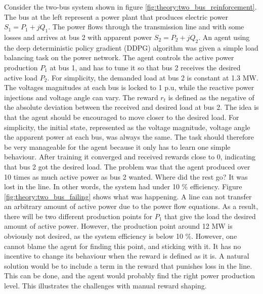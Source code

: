 \documentclass[class=book, crop=false, 11pt]{standalone}
\begin{document}
Consider the two-bus system shown in figure \ref{fig:theory:two_bus_reinforcement}. The bus at the left represent a power plant that produces electric power $S_{1} = P_{1} + jQ_{1}$. The power flows through the transmission line and with some losses and arrives at bus 2 with apparent power $S_{2} = P_{2} + jQ_{2}$. An agent using the deep deterministic policy gradient (DDPG) algorithm was given a simple load balancing task on the power network. The agent controls the active power production $P_{1}$ at bus 1, and has to tune it so that bus 2 receives the desired active load $P_{2}$. For simplicity, the demanded load at bus 2 is constant at 1.3 MW. The voltages magnitudes at each bus is locked to 1 p.u, while the reactive power injections and voltage angle can vary. The reward $r_{t}$ is defined as the negative of the absolute deviation between the received and desired load at bus 2. The idea is that the agent should be encouraged to move closer to the desired load. For simplicity, the initial state, represented as the voltage magnitude, voltage angle the apparent power at each bus, was always the same. The task should therefore be very manageable for the agent because it only has to learn one simple behaviour. After training it converged and received rewards close to 0, indicating that bus 2 got the desired load. The problem was that the agent produced over 10 times as much active power as bus 2 wanted. Where did the rest go? It was lost in the line. In other words, the system had under 10 \% efficiency. Figure \ref{fig:theory:two_bus_failing} shows what was happening. A line can not transfer an arbitrary amount of active power due to the power flow equations. As a result, there will be two different production points for $P_{1}$ that give the load the desired amount of active power. However, the production point around 12 MW is obviously not desired, as the system efficiency is below 10 \%. However, one cannot blame the agent for finding this point, and sticking with it. It has no incentive to change its behaviour when the reward is defined as it is. A natural solution would be to include a term in the reward that punishes loss in the line. This can be done, and the agent would probably find the right power production level. This illustrates the challenges with manual reward shaping. 
\end{document}
